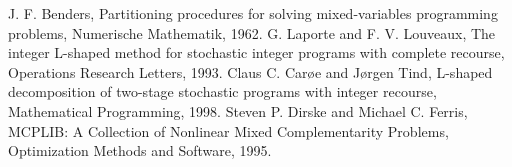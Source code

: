 \begin{thebibliography}{9}
    J. F. Benders, Partitioning procedures for solving mixed-variables programming problems, Numerische Mathematik, 1962.
	G. Laporte and F. V. Louveaux, The integer L-shaped method for stochastic integer programs with complete recourse, Operations Research Letters, 1993.
	Claus C. Car\o e and J\o rgen Tind, L-shaped decomposition of two-stage stochastic programs with integer recourse, Mathematical Programming, 1998.
	Steven P. Dirske and Michael C. Ferris, MCPLIB: A Collection of Nonlinear Mixed Complementarity Problems, Optimization Methods and Software, 1995.
\end{thebibliography}